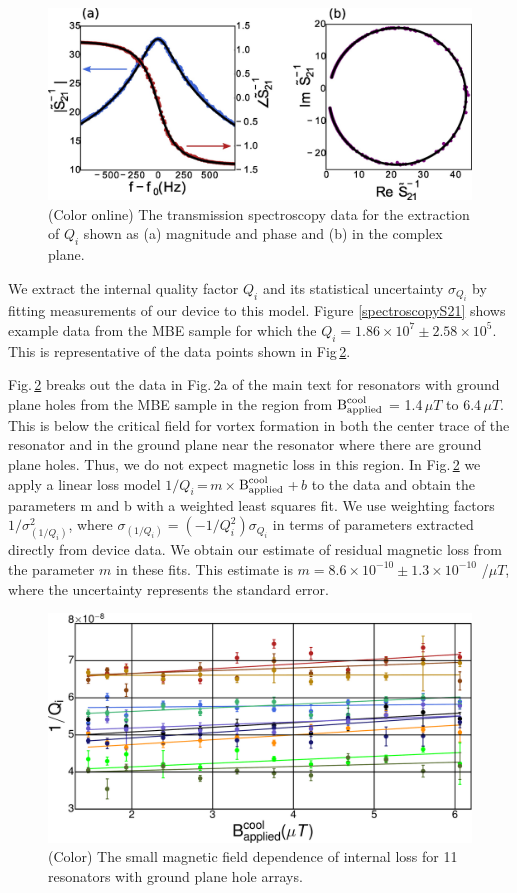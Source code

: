 \documentclass{report}
\begin{document}
\begin{figure}[b]
\begin{center}
\includegraphics[width=240 pt]{DielectricFluxTrap_Supp_Rev2_basicfit.jpg}
\caption{(Color online)  The transmission spectroscopy data for the extraction of $Q_{i}$ shown as (a) magnitude and phase and (b) in the complex plane.}
\label{basicfit}
\end{center}
\end{figure}

We extract the internal quality factor $Q_{i}$ and its statistical uncertainty $\sigma_{Q_{i}}$ by fitting measurements of our device to this model.  Figure \ref{spectroscopyS21} shows example data from the MBE sample for which the $Q_{i} = 1.86 \times 10^{7} \pm 2.58 \times 10^{5}$.  This is representative of the data points shown in Fig\,\ref{novortexdata}.

Fig.\,\ref{novortexdata} breaks out the data in Fig.\,2a of the main text for resonators with ground plane holes from the MBE sample in the region from $\text{B}^{\text{cool}}_{\text{applied}}$ = 1.4\,$\mu T$ to 6.4\,$\mu T$.  This is below the critical field for vortex formation in both the center trace of the resonator and in the ground plane near the resonator where there are ground plane holes.  Thus, we do not expect magnetic loss in this region.  In Fig.\,\ref{novortexdata} we apply a linear loss model $1/Q_{i}$\,=\,$m$\,$\times$\,$\text{B}^{\text{cool}}_{\text{applied}}$\,+\,$b$ to the data and obtain the parameters m and b with a weighted least squares fit.  We use weighting factors $1/\sigma^2_{\left( 1/Q_i \right)}$, where $\sigma_{\left( 1/Q_i \right)}=\left( -1/Q_{i}^{2} \right) \sigma_{Q_{i}}$ in terms of parameters extracted directly from device data.  We obtain our estimate of residual magnetic loss from the parameter $m$ in these fits.  This estimate is $m = 8.6\times10^{-10} \pm 1.3\times 10^{-10}$ /$\mu T$, where the uncertainty represents the standard error.


\setlength{\textfloatsep}{0pt}
\begin{figure}
\begin{center}
\includegraphics[width=230 pt]{DielectricFluxTrap_Supp_Rev2_qnovortex.pdf}
\caption{(Color)  The small magnetic field dependence of internal loss for 11 resonators with ground plane hole arrays.}
\label{novortexdata}
\end{center}
\end{figure}
\end{document}

